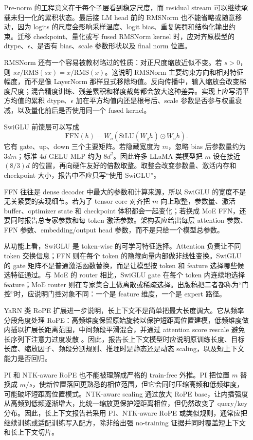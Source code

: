 \documentclass[UTF8,zihao=-4,openany]{ctexbook}
\begin{document}
Pre-norm 的工程意义在于每个子层看到稳定尺度，而 residual stream 可以继续承载未归一化的累积状态。最后接 LM head 前的 RMSNorm 也不能省略或随意移动，因为 logits 的尺度会影响采样温度、logit bias、重复惩罚和结构化输出约束。迁移 checkpoint、量化或写 fused RMSNorm kernel 时，应对齐原模型的 dtype、$\epsilon$、是否有 bias、scale 参数形状以及 final norm 位置。

RMSNorm 还有一个容易被教材略过的性质：对正尺度缩放近似不变。若 $s>0$，则 $sx/\mathrm{RMS}(sx)=x/\mathrm{RMS}(x)$。这说明 RMSNorm 主要约束方向和相对特征幅度，而不是像 LayerNorm 那样显式移除均值。反向传播中，输入缩放会改变梯度尺度；混合精度训练、残差累积和梯度裁剪都会放大这种差异。实现上应写清平方均值的累积 dtype、$\epsilon$ 加在平方均值内还是根号后、scale 参数是否参与权重衰减，以及量化前后是否使用同一个 fused kernel。

SwiGLU 前馈层可以写成
\[
  \mathrm{FFN}(h)=W_o(\mathrm{SiLU}(W_g h)\odot W_u h).
\]
它有 gate、up、down 三个主要矩阵。若隐藏宽度为 $m$，忽略 bias 后参数量约为 $3dm$；标准 $4d$ GELU MLP 约为 $8d^2$。因此许多 LLaMA 类模型把 $m$ 设在接近 $(8/3)d$ 的位置，再向硬件友好的倍数取整。取整会改变参数量、激活内存和 checkpoint 大小，报告中不应只写“使用 SwiGLU”。

FFN 往往是 dense decoder 中最大的参数和计算来源，所以 SwiGLU 的宽度不是无关紧要的实现细节。若为了 tensor core 对齐把 $m$ 向上取整，参数量、激活 buffer、optimizer state 和 checkpoint 体积都会一起变化；若换成 MoE FFN，还要同时报告总专家参数和每 token 激活参数。架构表应给出每层 attention 参数、FFN 参数、embedding/output head 参数，而不是只给一个模型总参数。

从功能上看，SwiGLU 是 token-wise 的可学习特征选择。Attention 负责让不同 token 交换信息；FFN 则在每个 token 的隐藏向量内部做非线性变换。SwiGLU 的 gate 矩阵不是普通激活函数替换，而是让模型按 token 和 feature 选择哪些候选特征通过。与 MoE 的 router 相比，SwiGLU gate 在每个 token 内连续地选择 feature；MoE router 则在专家集合上做离散或稀疏选择。出版稿把二者都称为“门控”时，应说明门控对象不同：一个是 feature 维度，一个是 expert 路径。

YaRN 类 RoPE 扩展进一步说明，长上下文不是简单把最大长度调大。它从频率分段角度处理 RoPE：高频维度保留原始旋转以保护短距离位置建模，低频维度做内插以扩展长距离范围，中间频段平滑混合，并通过 attention score rescale 避免长序列下注意力过度发散 \cite{peng2023yarn}。因此，报告长上下文模型时应说明原训练长度、目标长度、缩放因子、频段分割规则、推理时是静态还是动态 scaling，以及短上下文能力是否回归。

PI 和 NTK-aware RoPE 也不能被理解成严格的 train-free 外推。PI 把位置 $m$ 替换成 $m/s$，使新位置落回更熟悉的相位范围，但它会同时压缩高频和低频维度，可能破坏短距离位置模式。NTK-aware scaling 通过放大 RoPE base，让内插强度从高频到低频逐渐增大，比统一缩放更保护短距离相位，但仍然改变了 query/key 分布。因此，长上下文报告若采用 PI、NTK-aware RoPE 或类似规则，通常应把继续训练或适配训练写入配方，除非给出强 no-training 证据并同时覆盖短上下文和长上下文切片。
\end{document}
